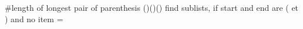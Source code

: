 #length of longest pair of  parenthesis ()()()
find sublists, if start and end are ( et ) and no item =
